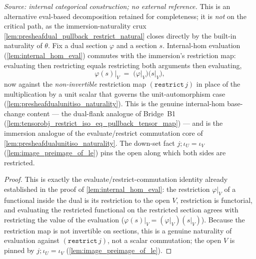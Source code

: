 \begin{lemma}\leanok
  \label{lem:presheafdual_eval_restrict_commute_apply}
  \textit{Source: internal categorical construction; no external reference.}
  This is an alternative eval-based decomposition retained for completeness; it is \emph{not} on the
  critical path, as the immersion-naturality crux \cref{lem:presheafdual_pullback_restrict_natural}
  closes directly by the built-in naturality of \(\theta\).
  Fix a dual section \(\varphi\) and a section \(s\). Internal-hom evaluation
  (\cref{lem:internal_hom_eval}) commutes with the immersion's restriction map: evaluating then
  restricting equals restricting both arguments then evaluating,
  \[
    \varphi(s)\big|_V \;=\; \bigl(\varphi\big|_V\bigr)\bigl(s\big|_V\bigr),
  \]
  now against the \emph{non-invertible} restriction map \((\mathtt{restrict}\,j)\) in place of the
  multiplication by a unit scalar that governs the unit-automorphism case
  (\cref{lem:presheafdualunitiso_naturality}). This is the genuine internal-hom base-change content ---
  the dual-flank analogue of Bridge~B1 (\cref{lem:tensorobj_restrict_iso_eq_pullback_tensor_map}) ---
  and is the immersion analogue of the evaluate/restrict commutation core of
  \cref{lem:presheafdualunitiso_naturality}. The
  down-set fact \(j \mathbin{;} \iota_U = \iota_V\) (\cref{lem:image_preimage_of_le}) pins the open
  along which both sides are restricted.
\end{lemma}
\begin{proof}
  \leanok
  This is exactly the evaluate/restrict-commutation identity already established in the proof of
  \cref{lem:internal_hom_eval}: the restriction \(\varphi|_V\) of a functional inside the dual is its
  restriction to the open \(V\), restriction is functorial, and evaluating the restricted functional
  on the restricted section agrees with restricting the value of the evaluation
  (\(\varphi(s)|_V = (\varphi|_V)(s|_V)\)). Because the restriction map is not invertible on sections,
  this is a genuine naturality of evaluation against \((\mathtt{restrict}\,j)\), not a scalar
  commutation; the open \(V\) is pinned by \(j \mathbin{;} \iota_U = \iota_V\)
  (\cref{lem:image_preimage_of_le}).
\end{proof}

